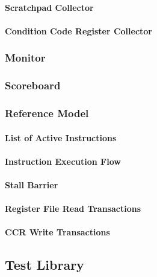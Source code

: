 \paragraph{Scratchpad Collector}

\paragraph{Condition Code Register Collector}

\subsubsection{Monitor}

\subsubsection{Scoreboard}

\subsubsection{Reference Model}

\paragraph{List of Active Instructions}

\paragraph{Instruction Execution Flow}

\paragraph{Stall Barrier}

\paragraph{Register File Read Transactions}

\paragraph{CCR Write Transactions}

\subsection{Test Library}